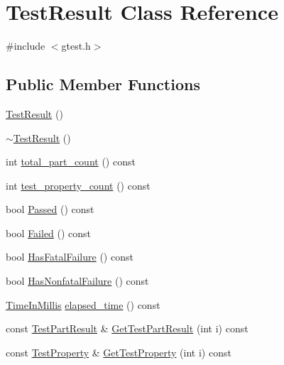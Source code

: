 \hypertarget{classtesting_1_1TestResult}{\section{\-Test\-Result \-Class \-Reference}
\label{d6/d6e/classtesting_1_1TestResult}
}


{\ttfamily \#include $<$gtest.\-h$>$}

\subsection*{\-Public \-Member \-Functions}
\begin{DoxyCompactItemize}
\item 
\hyperlink{classtesting_1_1TestResult_a434977b0f85d921ae7a2f7ae506576cf}{\-Test\-Result} ()
\item 
\hyperlink{classtesting_1_1TestResult_ae2816ad307720d4dbdc73941639da1de}{$\sim$\-Test\-Result} ()
\item 
int \hyperlink{classtesting_1_1TestResult_a79a22f05fa96cc8ba6a621af9e03bf90}{total\-\_\-part\-\_\-count} () const 
\item 
int \hyperlink{classtesting_1_1TestResult_aa7f0d1b12451e1f164d0534be7def11e}{test\-\_\-property\-\_\-count} () const 
\item 
bool \hyperlink{classtesting_1_1TestResult_ac97d5073365af8a73262fd9f6bf18656}{\-Passed} () const 
\item 
bool \hyperlink{classtesting_1_1TestResult_a7cf078354304c964c1934f53bf2bb4d7}{\-Failed} () const 
\item 
bool \hyperlink{classtesting_1_1TestResult_a6635ff3817f8f3dccf41e3e3524b8b15}{\-Has\-Fatal\-Failure} () const 
\item 
bool \hyperlink{classtesting_1_1TestResult_adb0618defd0d3f972b68be9f2759be14}{\-Has\-Nonfatal\-Failure} () const 
\item 
\hyperlink{namespacetesting_a338e9fd9474f0d8fafcb28b05f66a630}{\-Time\-In\-Millis} \hyperlink{classtesting_1_1TestResult_a4f91886b546ea9cc5ba2d374a62f3a9c}{elapsed\-\_\-time} () const 
\item 
const \hyperlink{classtesting_1_1TestPartResult}{\-Test\-Part\-Result} \& \hyperlink{classtesting_1_1TestResult_a3f0e4e52d9c5784edbc152e6a11fe181}{\-Get\-Test\-Part\-Result} (int i) const 
\item 
const \hyperlink{classtesting_1_1TestProperty}{\-Test\-Property} \& \hyperlink{classtesting_1_1TestResult_a03b4ca736db709afb9cae3b047035f01}{\-Get\-Test\-Property} (int i) const 

\end{DoxyCompactItemize}
